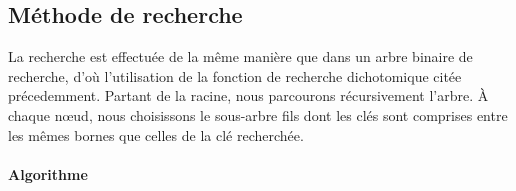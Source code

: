 \subsection{Méthode de recherche}
La recherche est effectuée de la même manière que dans un arbre binaire de recherche, d'où l'utilisation de la fonction de recherche dichotomique citée précedemment. Partant de la racine, nous parcourons récursivement l’arbre. À chaque nœud, nous choisissons le sous-arbre fils dont les clés sont comprises entre les mêmes bornes que celles de la clé recherchée.
\paragraph{Algorithme}
